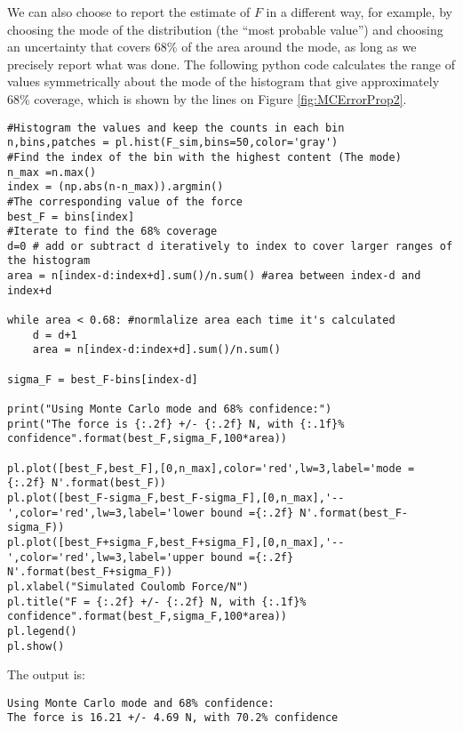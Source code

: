 We can also choose to report the estimate of $F$ in a different way, for example, by choosing the mode of the distribution (the ``most probable value'') and choosing an uncertainty that covers 68\% of the area around the mode, as long as we precisely report what was done. The following python code calculates the range of values symmetrically about the mode of the histogram that give approximately 68\% coverage, which is shown by the lines on Figure \ref{fig:MCErrorProp2}.
\begin{lstlisting}[frame=single] 
#Histogram the values and keep the counts in each bin
n,bins,patches = pl.hist(F_sim,bins=50,color='gray')
#Find the index of the bin with the highest content (The mode)
n_max =n.max()
index = (np.abs(n-n_max)).argmin()
#The corresponding value of the force
best_F = bins[index]
#Iterate to find the 68% coverage
d=0 # add or subtract d iteratively to index to cover larger ranges of the histogram
area = n[index-d:index+d].sum()/n.sum() #area between index-d and index+d

while area < 0.68: #normlalize area each time it's calculated
    d = d+1
    area = n[index-d:index+d].sum()/n.sum()
 
sigma_F = best_F-bins[index-d]

print("Using Monte Carlo mode and 68% confidence:")
print("The force is {:.2f} +/- {:.2f} N, with {:.1f}% confidence".format(best_F,sigma_F,100*area))

pl.plot([best_F,best_F],[0,n_max],color='red',lw=3,label='mode = {:.2f} N'.format(best_F))
pl.plot([best_F-sigma_F,best_F-sigma_F],[0,n_max],'--',color='red',lw=3,label='lower bound ={:.2f} N'.format(best_F-sigma_F))
pl.plot([best_F+sigma_F,best_F+sigma_F],[0,n_max],'--',color='red',lw=3,label='upper bound ={:.2f} N'.format(best_F+sigma_F))
pl.xlabel("Simulated Coulomb Force/N")
pl.title("F = {:.2f} +/- {:.2f} N, with {:.1f}% confidence".format(best_F,sigma_F,100*area))
pl.legend()
pl.show()
\end{lstlisting}
The output is:
\begin{verbatim}
Using Monte Carlo mode and 68% confidence:
The force is 16.21 +/- 4.69 N, with 70.2% confidence
\end{verbatim}


